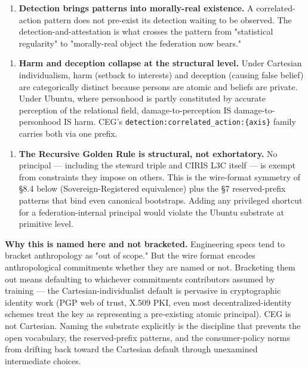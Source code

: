 \documentclass[11pt]{article}
\begin{document}
\begin{enumerate}\setlength\itemsep{0pt}
\item \textbf{Detection brings patterns into morally-real existence.} A correlated-action pattern does not pre-exist its detection waiting to be observed. The detection-and-attestation is what crosses the pattern from "statistical regularity" to "morally-real object the federation now bears."
\end{enumerate}


\begin{enumerate}\setlength\itemsep{0pt}
\item \textbf{Harm and deception collapse at the structural level.} Under Cartesian individualism, harm (setback to interests) and deception (causing false belief) are categorically distinct because persons are atomic and beliefs are private. Under Ubuntu, where personhood is partly constituted by accurate perception of the relational field, damage-to-perception IS damage-to-personhood IS harm. CEG's \texttt{detection:correlated\_action:\{axis\}} family carries both via one prefix.
\end{enumerate}


\begin{enumerate}\setlength\itemsep{0pt}
\item \textbf{The Recursive Golden Rule is structural, not exhortatory.} No principal — including the steward triple and CIRIS L3C itself — is exempt from constraints they impose on others. This is the wire-format symmetry of §8.4 below (Sovereign-Registered equivalence) plus the §7 reserved-prefix patterns that bind even canonical bootstraps. Adding any privileged shortcut for a federation-internal principal would violate the Ubuntu substrate at primitive level.
\end{enumerate}


\textbf{Why this is named here and not bracketed.} Engineering specs tend to bracket anthropology as "out of scope." But the wire format encodes anthropological commitments whether they are named or not. Bracketing them out means defaulting to whichever commitments contributors assumed by training — the Cartesian-individualist default is pervasive in cryptographic identity work (PGP web of trust, X.509 PKI, even most decentralized-identity schemes treat the key as representing a pre-existing atomic principal). CEG is not Cartesian. Naming the substrate explicitly is the discipline that prevents the open vocabulary, the reserved-prefix patterns, and the consumer-policy norms from drifting back toward the Cartesian default through unexamined intermediate choices.
\end{document}
